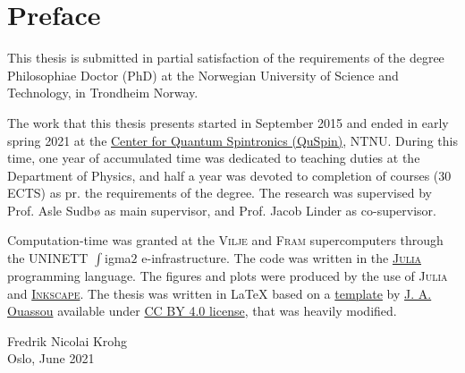 \chapter*{Preface}\noindent
%
This thesis is submitted in partial satisfaction of the requirements of the degree Philosophiae Doctor (PhD) at the
Norwegian University of Science and Technology, in Trondheim Norway.

The work that this thesis presents started in September 2015 and ended in early spring 2021 at the
\href{https://www.ntnu.edu/quspin/center-for-quantum-spintronics}{Center for Quantum Spintronics (QuSpin)}, \textsc{NTNU}. During this time, one
year of accumulated time was dedicated to teaching duties at the Department of Physics, and half a year
was devoted to completion of courses (30 ECTS) as pr. the requirements of the degree.
The research was supervised by
Prof. Asle Sudb{\o} as main supervisor, and Prof. Jacob Linder as co-supervisor.

Computation-time was granted at the \textsc{Vilje} and \textsc{Fram} supercomputers through the UNINETT $\int$igma$2$ e-infrastructure. The code was written in
the \href{https://julialang.org/}{\textsc{Julia}} programming language. The figures and plots were produced by the use of \textsc{Julia} and
\href{https://inkscape.org/}{\textsc{Inkscape}}. The thesis was written in {\LaTeX} based on a \href{https://creativecommons.org/licenses/by/4.0/}{template}
by \href{https://github.com/jabirali}{J. A. Ouassou} available under \href{https://creativecommons.org/licenses/by/4.0/}{CC BY 4.0 license},
that was heavily modified.

\vspace{2cm}

\noindent Fredrik Nicolai Krohg\\
Oslo, June 2021
